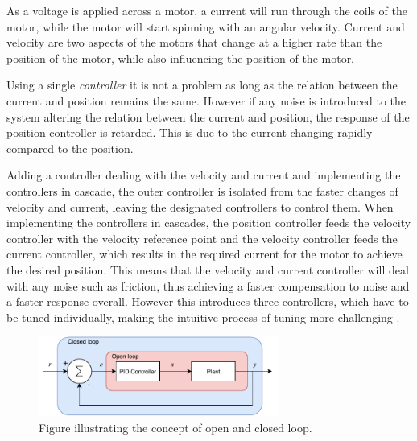 \documentclass[../../main.tex]{subfiles}
\begin{document}

As a voltage is applied across a motor, a current will run through the coils of the motor, while the motor will start spinning with an angular velocity. Current and velocity are two aspects of the motors that change at a higher rate than the position of the motor, while also influencing the position of the motor. 

Using a single \textit{controller} it is not a problem as long as the relation between the current and position remains the same. 
However if any noise is introduced to the system altering the relation between the current and position, the response of the position controller is retarded. This is due to the current changing rapidly compared to the position. 

Adding a controller dealing with the velocity and current and implementing the controllers in cascade, the outer controller is isolated from the faster changes of velocity and current, leaving the designated controllers to control them. When implementing the controllers in cascades, the position controller feeds the velocity controller with the velocity reference point and the velocity controller feeds the current controller, which results in the required current for the motor to achieve the desired position. This means that the velocity and current controller will deal with any noise such as friction, thus achieving a faster compensation to noise and a faster response overall. However this introduces three controllers, which have to be tuned individually, making the intuitive process of tuning more challenging \cite{CascadeControl}.

\begin{figure}[H]
    \centering
    \includegraphics[width=0.7\textwidth]{Sections/Miscellaneous/Images/Open_closed_Diagram.pdf}
    \caption{Figure illustrating the concept of open and closed loop. }
    \label{fig:Open_Close_loop}
\end{figure}
\end{document}
